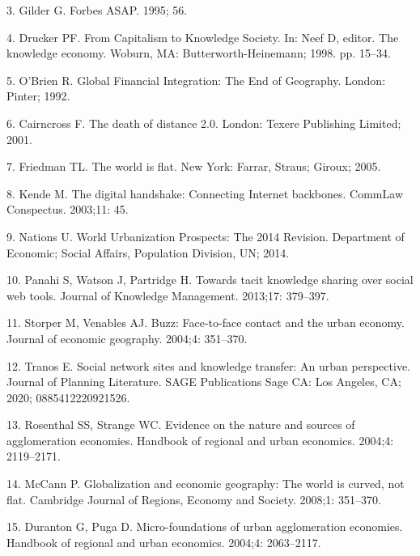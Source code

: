 \documentclass[10pt,letterpaper]{article}
\begin{document}
\leavevmode\hypertarget{ref-gilder_notitle_1995}{}%
3. Gilder G. Forbes ASAP. 1995; 56.

\leavevmode\hypertarget{ref-peter_f_drucker_capitalism_1998}{}%
4. Drucker PF. From Capitalism to Knowledge Society. In: Neef D, editor.
The knowledge economy. Woburn, MA: Butterworth-Heinemann; 1998. pp.
15--34.

\leavevmode\hypertarget{ref-obrien_global_1992}{}%
5. O'Brien R. Global Financial Integration: The End of Geography.
London: Pinter; 1992.

\leavevmode\hypertarget{ref-frances_cairncross_death_2001}{}%
6. Cairncross F. The death of distance 2.0. London: Texere Publishing
Limited; 2001.

\leavevmode\hypertarget{ref-friedman_world_2005}{}%
7. Friedman TL. The world is flat. New York: Farrar, Straus; Giroux;
2005.

\leavevmode\hypertarget{ref-kende_digital_2003}{}%
8. Kende M. The digital handshake: Connecting Internet backbones.
CommLaw Conspectus. 2003;11: 45.

\leavevmode\hypertarget{ref-united_nations_world_2014}{}%
9. Nations U. World Urbanization Prospects: The 2014 Revision.
Department of Economic; Social Affairs, Population Division, UN; 2014.

\leavevmode\hypertarget{ref-panahi_towards_2013}{}%
10. Panahi S, Watson J, Partridge H. Towards tacit knowledge sharing
over social web tools. Journal of Knowledge Management. 2013;17:
379--397.

\leavevmode\hypertarget{ref-storper_buzz_2004}{}%
11. Storper M, Venables AJ. Buzz: Face-to-face contact and the urban
economy. Journal of economic geography. 2004;4: 351--370.

\leavevmode\hypertarget{ref-tranos2020social}{}%
12. Tranos E. Social network sites and knowledge transfer: An urban
perspective. Journal of Planning Literature. SAGE Publications Sage CA:
Los Angeles, CA; 2020; 0885412220921526.

\leavevmode\hypertarget{ref-rosenthal_evidence_2004}{}%
13. Rosenthal SS, Strange WC. Evidence on the nature and sources of
agglomeration economies. Handbook of regional and urban economics.
2004;4: 2119--2171.

\leavevmode\hypertarget{ref-mccann_globalization_2008}{}%
14. McCann P. Globalization and economic geography: The world is curved,
not flat. Cambridge Journal of Regions, Economy and Society. 2008;1:
351--370.

\leavevmode\hypertarget{ref-duranton_micro-foundations_2004}{}%
15. Duranton G, Puga D. Micro-foundations of urban agglomeration
economies. Handbook of regional and urban economics. 2004;4: 2063--2117.
\end{document}
